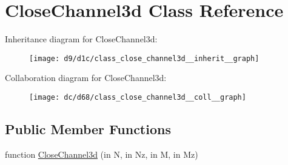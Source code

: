 \hypertarget{class_close_channel3d}{}\section{Close\+Channel3d Class Reference}
\label{class_close_channel3d}


Inheritance diagram for Close\+Channel3d\+:
\nopagebreak
\begin{figure}[H]
\begin{center}
\leavevmode
\texttt{[image: d9/d1c/class\_close\_channel3d\_\_inherit\_\_graph]}
\end{center}
\end{figure}


Collaboration diagram for Close\+Channel3d\+:
\nopagebreak
\begin{figure}[H]
\begin{center}
\leavevmode
\texttt{[image: dc/d68/class\_close\_channel3d\_\_coll\_\_graph]}
\end{center}
\end{figure}
\subsection*{Public Member Functions}
\begin{DoxyCompactItemize}
\item 
function \hyperlink{class_close_channel3d_a4f630280bcced150c9dd284c84898a18}{Close\+Channel3d} (in N, in Nz, in M, in Mz)
\end{DoxyCompactItemize}
